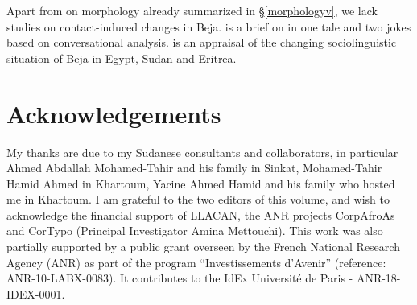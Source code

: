 \documentclass[output=paper]{langsci/langscibook}
\begin{document}
Apart from \citet{Vanhove2012} on  morphology already summarized in §\ref{morphologyv}, we lack studies on contact-induced changes in Beja. \citet{Vanhove2003} is a brief  on  in one tale and two jokes based on conversational analysis. \citet{Wedekind2012} is an appraisal of the changing sociolinguistic situation of Beja in Egypt, Sudan and Eritrea.

\section*{Acknowledgements}

My thanks are due to my Sudanese consultants and collaborators, in particular Ahmed Abdallah Mohamed-Tahir and his family in Sinkat, Mohamed-Tahir Hamid Ahmed in Khartoum, Yacine Ahmed Hamid and his family who hosted me in Khartoum. I am grateful to the two editors of this volume, and wish to acknowledge the financial support of LLACAN, the ANR projects CorpAfroAs and CorTypo (Principal Investigator Amina Mettouchi). This work was also partially supported by a public grant overseen by the French National Research Agency (ANR) as part of the program “Investissements d'Avenir” (reference: ANR-10-LABX-0083). It contributes to the IdEx Université de Paris - ANR-18-IDEX-0001.
\end{document}
